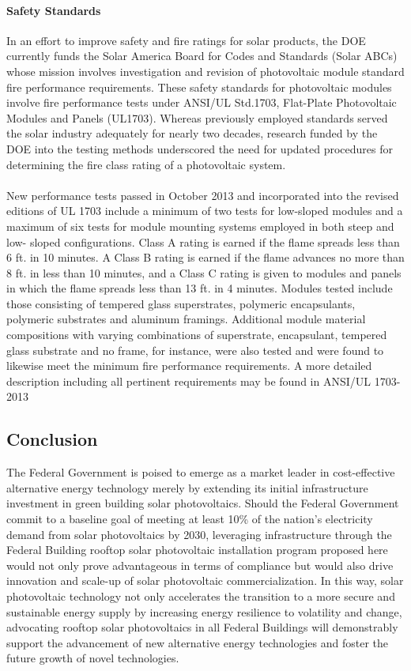 \paragraph{Safety Standards}
In an effort to improve safety and fire ratings for solar products, the DOE currently funds the Solar America Board for Codes and Standards (Solar ABCs) whose mission involves investigation and revision of photovoltaic module standard fire performance requirements. These safety standards for photovoltaic modules involve fire performance tests under ANSI/UL Std.1703, Flat-Plate Photovoltaic Modules and Panels (UL1703). Whereas previously employed standards served the solar industry adequately for nearly two decades, research funded by the DOE into the testing methods underscored the need for updated procedures for determining the fire class rating of a photovoltaic system.
\\\\
\noindent New performance tests passed in October 2013 and incorporated into the revised editions of UL 1703 include a minimum of two tests for low-sloped modules and a maximum of six tests for module mounting systems employed in both steep and low- sloped configurations. Class A rating is earned if the flame spreads less than 6 ft. in 10 minutes. A Class B rating is earned if the flame advances no more than 8 ft. in less than 10 minutes, and a Class C rating is given to modules and panels in which the flame spreads less than 13 ft. in 4 minutes. Modules tested include those consisting of tempered glass superstrates, polymeric encapsulants, polymeric substrates and aluminum framings. Additional module material compositions with varying combinations of superstrate, encapsulant, tempered glass substrate and no frame, for instance, were also tested and were found to likewise meet the minimum fire performance requirements. A more detailed description including all pertinent requirements may be found in ANSI/UL 1703-2013

\subsection{Conclusion}
The Federal Government is poised to emerge as a market leader in cost-effective alternative energy technology merely by extending its initial infrastructure investment in green building solar photovoltaics. Should the Federal Government commit to a baseline goal of meeting at least 10\% of the nation’s electricity demand from solar photovoltaics by 2030, leveraging infrastructure through the Federal Building rooftop solar photovoltaic installation program proposed here would not only prove advantageous in terms of compliance but would also drive innovation and scale-up of solar photovoltaic commercialization. In this way, solar photovoltaic technology not only accelerates the transition to a more secure and sustainable energy supply by increasing energy resilience to volatility and change, advocating rooftop solar photovoltaics in all Federal Buildings will demonstrably support the advancement of new alternative energy technologies and foster the future growth of novel technologies.

